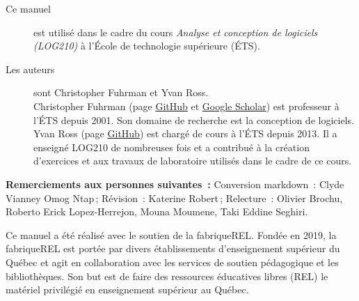 \small
\begin{description}
\item[Ce manuel] est utilisé dans le cadre du cours \emph{Analyse et
conception de logiciels (LOG210)} à l'École de technologie supérieure
(ÉTS).
\item[Les auteurs]sont Christopher Fuhrman et Yvan Ross.\\
Christopher Fuhrman (page \href{https://github.com/fuhrmanator}{GitHub} et \href{https://scholar.google.com/citations?user=Qa5SpUwAAAAJ\&hl=fr\&oi=ao}{Google Scholar}) est professeur à l'ÉTS depuis 2001.
Son domaine de recherche est la conception de logiciels.\\
Yvan Ross (page \href{https://github.com/yvanross}{GitHub}) est chargé de cours à l'ÉTS depuis 2013. Il a enseigné LOG210 de nombreuses fois et a contribué à la création d'exercices et aux travaux de laboratoire utilisés dans le cadre de ce cours.
\end{description}

\textbf{Remerciements aux personnes suivantes~:} Conversion markdown~: Clyde Vianney Omog Ntap\,; Révision~: Katerine Robert\,; Relecture~: Olivier Brochu, Roberto Erick Lopez-Herrejon, Mouna Moumene, Taki Eddine Seghiri. 


Ce manuel a été réalisé avec le soutien de la
fabriqueREL. Fondée en 2019, la fabriqueREL est
portée par divers établissements d’enseignement
supérieur du Québec et agit en collaboration avec
les services de soutien pédagogique et les
bibliothèques. Son but est de faire des ressources
éducatives libres (REL) le matériel privilégié en
enseignement supérieur au Québec.


